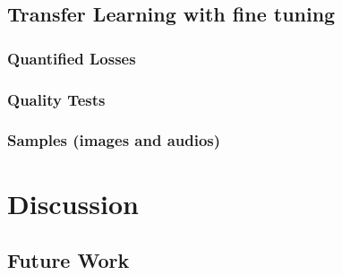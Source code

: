 \documentclass{book}
\begin{document}
\section{Transfer Learning with fine tuning}
\subsection{Quantified Losses}
\subsection{Quality Tests}
\subsection{Samples (images and audios)}

\chapter{Discussion}
\section{Future Work}
\end{document}
